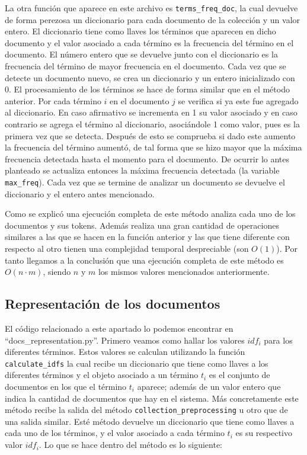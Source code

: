 \documentclass[runningheads]{llncs}
\begin{document}
	La otra funci\'on que aparece en este archivo es \verb|terms_freq_doc|, la cual devuelve de forma perezosa un diccionario para cada documento de la colecci\'on y un valor entero. El diccionario tiene como llaves los t\'erminos que aparecen en dicho documento y el valor asociado a cada t\'ermino es la frecuencia del t\'ermino en el documento. El n\'umero entero que se devuelve junto con el diccionario es la frecuencia del t\'ermino de mayor frecuencia en el documento. Cada vez que se detecte un documento nuevo, se crea un diccionario y un entero inicializado con 0. El procesamiento de los t\'erminos se hace de forma similar que en el m\'etodo anterior. Por cada t\'ermino $i$ en el documento $j$ se verifica si ya este fue agregado al diccionario. En caso afirmativo se incrementa en 1 su valor asociado y en caso contrario se agrega el t\'ermino al diccionario, asoci\'andole 1 como valor, pues es la primera vez que se detecta. Despu\'es de esto se comprueba si dado este aumento la frecuencia del t\'ermino aument\'o, de tal forma que se hizo mayor que la m\'axima frecuencia detectada hasta el momento para el documento. De ocurrir lo antes planteado se actualiza entonces la m\'axima frecuencia detectada (la variable \verb|max_freq|). Cada vez que se termine de analizar un documento se devuelve el diccionario y el entero antes mencionado.
	
	Como se explic\'o una ejecuci\'on completa de este m\'etodo analiza cada uno de los documentos y sus tokens. Adem\'as realiza una gran cantidad de operaciones similares a las que se hacen en la funci\'on anterior y las que tiene diferente con respecto al otro tienen una complejidad temporal despreciable (son $O(1)$). Por tanto llegamos a la conclusi\'on que una ejecuci\'on completa de este m\'etodo es $O(n\cdot m)$, siendo $n$ y $m$ los mismos valores mencionados anteriormente.
	
	\subsection{Representaci\'on de los documentos}
	
	El c\'odigo relacionado a este apartado lo podemos encontrar en\\ ``docs\_representation.py''. Primero veamos como hallar los valores $idf_i$ para los diferentes t\'erminos. Estos valores se calculan utilizando la funci\'on \verb|calculate_idfs| la cual recibe un diccionario que tiene como llaves a los diferentes t\'erminos y el objeto asociado a un t\'ermino $t_i$ es el conjunto de documentos en los que el t\'ermino $t_i$ aparece; adem\'as de un valor entero que indica la cantidad de documentos que hay en el sistema. M\'as concretamente este m\'etodo recibe la salida del m\'etodo \verb|collection_preprocessing| u otro que de una salida similar. Est\'e m\'etodo devuelve un diccionario que tiene como llaves a cada uno de los t\'erminos, y el valor asociado a cada t\'ermino $t_i$ es su respectivo valor $idf_i$. Lo que se hace dentro del m\'etodo es lo siguiente: 
\end{document}

